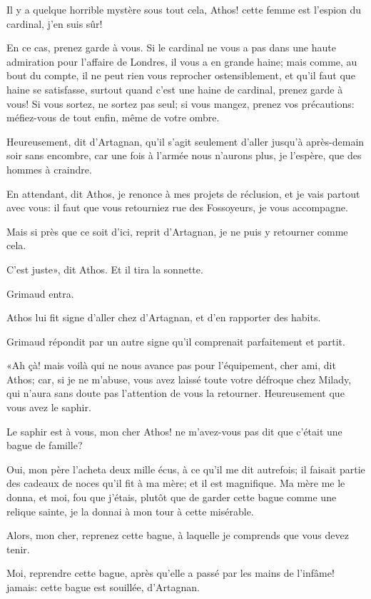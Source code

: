 \speak  Il y a quelque horrible mystère sous tout cela, Athos! cette femme est l'espion du cardinal, j'en suis sûr! 

\speak  En ce cas, prenez garde à vous. Si le cardinal ne vous a pas dans une haute admiration pour l'affaire de Londres, il vous a en grande haine; mais comme, au bout du compte, il ne peut rien vous reprocher ostensiblement, et qu'il faut que haine se satisfasse, surtout quand c'est une haine de cardinal, prenez garde à vous! Si vous sortez, ne sortez pas seul; si vous mangez, prenez vos précautions: méfiez-vous de tout enfin, même de votre ombre. 

\speak  Heureusement, dit d'Artagnan, qu'il s'agit seulement d'aller jusqu'à après-demain soir sans encombre, car une fois à l'armée nous n'aurons plus, je l'espère, que des hommes à craindre. 

\speak  En attendant, dit Athos, je renonce à mes projets de réclusion, et je vais partout avec vous: il faut que vous retourniez rue des Fossoyeurs, je vous accompagne. 

\speak  Mais si près que ce soit d'ici, reprit d'Artagnan, je ne puis y retourner comme cela. 

\speak  C'est juste», dit Athos. Et il tira la sonnette. 

Grimaud entra. 

Athos lui fit signe d'aller chez d'Artagnan, et d'en rapporter des habits. 

Grimaud répondit par un autre signe qu'il comprenait parfaitement et partit. 

«Ah çà! mais voilà qui ne nous avance pas pour l'équipement, cher ami, dit Athos; car, si je ne m'abuse, vous avez laissé toute votre défroque chez Milady, qui n'aura sans doute pas l'attention de vous la retourner. Heureusement que vous avez le saphir. 

\speak  Le saphir est à vous, mon cher Athos! ne m'avez-vous pas dit que c'était une bague de famille? 

\speak  Oui, mon père l'acheta deux mille écus, à ce qu'il me dit autrefois; il faisait partie des cadeaux de noces qu'il fit à ma mère; et il est magnifique. Ma mère me le donna, et moi, fou que j'étais, plutôt que de garder cette bague comme une relique sainte, je la donnai à mon tour à cette misérable. 

\speak  Alors, mon cher, reprenez cette bague, à laquelle je comprends que vous devez tenir. 

\speak  Moi, reprendre cette bague, après qu'elle a passé par les mains de l'infâme! jamais: cette bague est souillée, d'Artagnan. 

